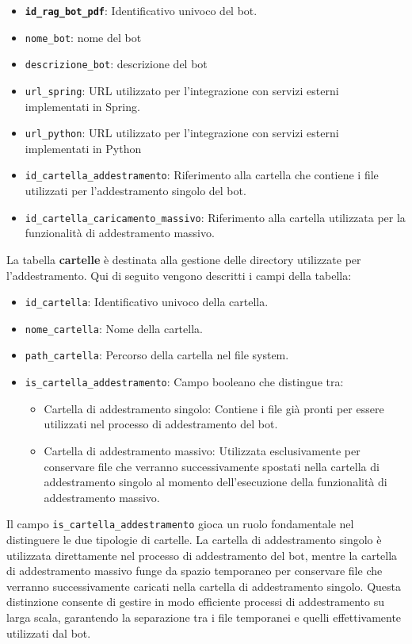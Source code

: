 \documentclass[a4paper,twoside,12pt]{toptesi}
\begin{document}
\begin{itemize}
\item \textbf{\textnormal{\lstinline|id_rag_bot_pdf|}}: Identificativo univoco del bot.
\item \textnormal{\lstinline|nome_bot|}: nome del bot
\item \textnormal{\lstinline|descrizione_bot|}: descrizione del bot
\item \textnormal{\lstinline|url_spring|}: URL utilizzato per l'integrazione con servizi esterni implementati in Spring.
\item \textnormal{\lstinline|url_python|}: URL utilizzato per l'integrazione con servizi esterni implementati in Python
\item \textnormal{\lstinline|id_cartella_addestramento|}: Riferimento alla cartella che contiene i file utilizzati per l'addestramento singolo del bot.
\item \textnormal{\lstinline|id_cartella_caricamento_massivo|}: Riferimento alla cartella utilizzata per la funzionalità di addestramento massivo.
\end{itemize}

La tabella \textbf{cartelle} è destinata alla gestione delle directory utilizzate per l'addestramento. Qui di seguito vengono descritti i campi della tabella:

\begin{itemize}
\item \textnormal{\lstinline|id_cartella|}: Identificativo univoco della cartella.
\item \textnormal{\lstinline|nome_cartella|}: Nome della cartella.
\item \textnormal{\lstinline|path_cartella|}: Percorso della cartella nel file system.
\item \textnormal{\lstinline|is_cartella_addestramento|}: Campo booleano che distingue tra:
	\begin{itemize}
	\item Cartella di addestramento singolo: Contiene i file già pronti per essere utilizzati nel processo di addestramento del bot.
	\item Cartella di addestramento massivo: Utilizzata esclusivamente per conservare file che verranno successivamente spostati nella cartella di addestramento singolo al 					momento dell’esecuzione della funzionalità di addestramento massivo.
	\end{itemize}
\end{itemize}

Il campo \textnormal{\lstinline|is_cartella_addestramento|} gioca un ruolo fondamentale nel distinguere le due tipologie di cartelle. La cartella di addestramento singolo è utilizzata direttamente nel processo di addestramento del bot, mentre la cartella di addestramento massivo funge da spazio temporaneo per conservare file che verranno successivamente caricati nella cartella di addestramento singolo. Questa distinzione consente di gestire in modo efficiente processi di addestramento su larga scala, garantendo la separazione tra i file temporanei e quelli effettivamente utilizzati dal bot.
\end{document}
